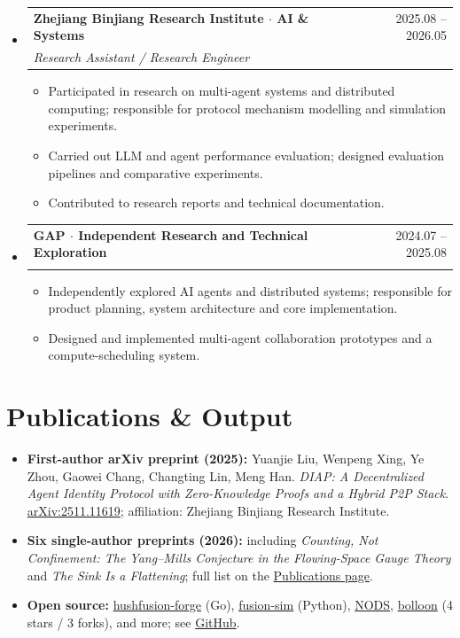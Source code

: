 \documentclass[10pt,a4paper]{article}
\makeatletter
\newcommand{\resumeItem}[1]{\item \small #1}
\newcommand{\resumeSubheading}[4]{
  \item
  \begin{tabular*}{0.97\textwidth}{l@{\extracolsep{\fill}}r}
    \textbf{#1} & #2 \\
    \textit{\small #3} & \textit{\small #4} \\
  \end{tabular*}
}
\makeatother
\begin{document}
\begin{itemize}[leftmargin=0.15in, label={}, topsep=2pt]

\resumeSubheading{Zhejiang Binjiang Research Institute $\cdot$ AI \& Systems}{2025.08 -- 2026.05}{Research Assistant / Research Engineer}{}
\begin{itemize}[topsep=1pt, label=\textbullet]
\resumeItem{Participated in research on multi-agent systems and distributed computing; responsible for protocol mechanism modelling and simulation experiments.}
\resumeItem{Carried out LLM and agent performance evaluation; designed evaluation pipelines and comparative experiments.}
\resumeItem{Contributed to research reports and technical documentation.}
\end{itemize}

\resumeSubheading{GAP $\cdot$ Independent Research and Technical Exploration}{2024.07 -- 2025.08}{}{}
\begin{itemize}[topsep=1pt, label=\textbullet]
\resumeItem{Independently explored AI agents and distributed systems; responsible for product planning, system architecture and core implementation.}
\resumeItem{Designed and implemented multi-agent collaboration prototypes and a compute-scheduling system.}
\end{itemize}

\end{itemize}

\section{Publications \& Output}

\begin{itemize}[leftmargin=0.15in, topsep=2pt]
\resumeItem{\textbf{First-author arXiv preprint (2025):} Yuanjie Liu, Wenpeng Xing, Ye Zhou, Gaowei Chang, Changting Lin, Meng Han. \emph{DIAP: A Decentralized Agent Identity Protocol with Zero-Knowledge Proofs and a Hybrid P2P Stack}. \href{https://arxiv.org/abs/2511.11619}{arXiv:2511.11619}; affiliation: Zhejiang Binjiang Research Institute.}
\resumeItem{\textbf{Six single-author preprints (2026):} including \emph{Counting, Not Confinement: The Yang--Mills Conjecture in the Flowing-Space Gauge Theory} and \emph{The Sink Is a Flattening}; full list on the \href{https://logos-42.github.io/publications/}{Publications page}.}
\resumeItem{\textbf{Open source:} \href{https://github.com/logos-42/hushfusion-forge}{hushfusion-forge} (Go), \href{https://github.com/logos-42/fusion-sim}{fusion-sim} (Python), \href{https://github.com/logos-42/NODS}{NODS}, \href{https://github.com/logos-42/bolloon}{bolloon} (4 stars / 3 forks), and more; see \href{https://github.com/logos-42}{GitHub}.}
\end{itemize}
\end{document}
